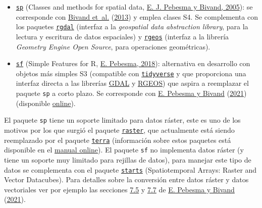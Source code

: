 \documentclass[
  spanish,
]{book}
\theoremstyle{break}
\begin{document}
\begin{itemize}
\item
  \href{https://CRAN.R-project.org/package=sp}{\texttt{sp}} (Classes and methods for spatial data, \protect\hyperlink{ref-Pebesma2005}{E. J. Pebesma y Bivand, 2005}): se corresponde con \protect\hyperlink{ref-Bivand2013}{Bivand et~al.} (\protect\hyperlink{ref-Bivand2013}{2013}) y emplea clases S4. Se complementa con los paquetes \href{https://CRAN.R-project.org/package=rgdal}{\texttt{rgdal}} (interfaz a la \emph{geospatial data abstraction library}, para la lectura y escritura de datos espaciales) y \href{https://CRAN.R-project.org/package=rgeos}{\texttt{rgeos}} (interfaz a la librería \emph{Geometry Engine Open Source}, para operaciones geométricas).
\item
  \href{https://r-spatial.github.io/sf}{\texttt{sf}} (Simple Features for R, \protect\hyperlink{ref-Pebesma2018}{E. Pebesma, 2018}): alternativa en desarrollo con objetos más simples S3 (compatible con \href{http://tidyverse.org}{\texttt{tidyverse}} y que proporciona una interfaz directa a las librerías \href{https://gdal.org}{GDAL} y \href{https://trac.osgeo.org/geos}{RGEOS}) que aspira a reemplazar el paquete \texttt{sp} a corto plazo. Se corresponde con \protect\hyperlink{ref-Pebesma2021}{E. Pebesma y Bivand} (\protect\hyperlink{ref-Pebesma2021}{2021}) (disponible \href{https://keen-swartz-3146c4.netlify.app}{online}).
\end{itemize}

El paquete \texttt{sp} tiene un soporte limitado para datos ráster, este es uno de los motivos por los que surgió el paquete \href{https://CRAN.R-project.org/package=raster}{\texttt{raster}}, que actualmente está siendo reemplazado por el paquete \href{https://CRAN.R-project.org/package=terra}{\texttt{terra}} (información sobre estos paquetes está disponible en el \href{https://rspatial.org/}{manual online}).
El paquete \texttt{sf} no implementa datos ráster (y tiene un soporte muy limitado para rejillas de datos), para manejar este tipo de datos se complementa con el paquete \href{https://r-spatial.github.io/stars}{\texttt{starts}} (Spatiotemporal Arrays: Raster and Vector Datacubes).
Para detalles sobre la conversión entre datos ráster y datos vectoriales ver por ejemplo las secciones \href{https://keen-swartz-3146c4.netlify.app/sf.html\#raster-to-vector}{7.5} y \href{https://keen-swartz-3146c4.netlify.app/sf.html\#warp}{7.7} de \protect\hyperlink{ref-Pebesma2021}{E. Pebesma y Bivand} (\protect\hyperlink{ref-Pebesma2021}{2021}).
\end{document}
